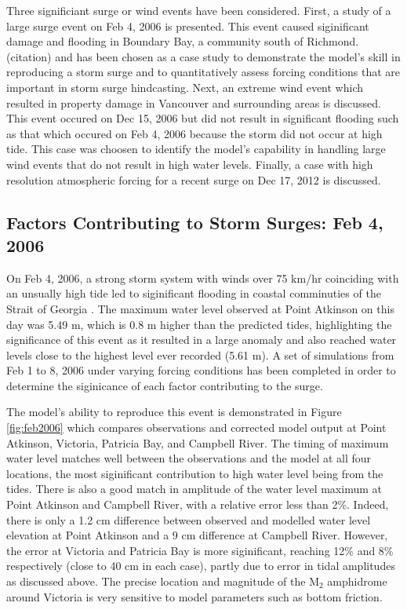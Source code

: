 \documentclass[pdftex,10pt]{article}
\begin{document}
Three significiant surge or wind events have been considered. First, a study of a large surge event on Feb 4, 2006 is presented. This event caused siginificant damage and flooding in Boundary Bay, a community south of Richmond. (citation) and has been chosen as a case study to demonstrate the model's skill in reproducing a storm surge and to quantitatively assess forcing conditions that are important in storm surge hindcasting. 
Next, an extreme wind event which resulted in property damage in Vancouver and surrounding areas is discussed. This event occured on Dec 15, 2006 but did not result in significant flooding such as that which occured on Feb 4, 2006 because the storm did not occur at high tide. This case was choosen to identify the model's capability in handling large wind events that do not result in high water levels. Finally, a case with high resolution atmospheric forcing for a recent surge on Dec 17, 2012 is discussed.


\subsection{Factors Contributing to Storm Surges: Feb 4, 2006}

On Feb 4, 2006, a strong storm system with winds over 75 km/hr coinciding with an unsually high tide led to siginificant flooding in coastal comminuties of the Strait of Georgia \citep{romanowski2010storm}. The maximum water level observed at Point Atkinson on this day was 5.49 m, which is 0.8 m higher than the predicted tides, highlighting the significance of this event as it resulted in a large anomaly and also reached water levels close to the highest level ever recorded (5.61 m). A set of simulations from Feb 1 to 8, 2006 under varying forcing conditions has been completed in order to determine the siginicance of each factor contributing to the surge.

The model's ability to reproduce this event is demonstrated in Figure \ref{fig:feb2006} which compares observations and corrected model output at Point Atkinson, Victoria, Patricia Bay, and Campbell River. The timing of maximum water level matches well between the observations and the model at all four locations, the most siginificant contribution to high water level being from the tides. There is also a good match in amplitude of the water level maximum at Point Atkinson and Campbell River, with a relative error less than 2\%. Indeed, there is only a 1.2 cm difference between observed and modelled water level elevation at Point Atkinson and a 9 cm difference at Campbell River. However, the error at Victoria and Patricia Bay is more siginificant, reaching 12\% and 8\% respectively (close to 40 cm in each case), partly due to error in tidal amplitudes as discussed above. The precise location and magnitude of the M$_2$ amphidrome around Victoria is very sensitive to model parameters such as bottom friction. 
\end{document}
